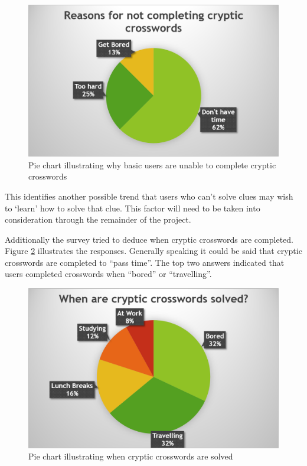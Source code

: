 \begin{figure}[H]
  \centering
  \includegraphics[scale=0.9]{graphs/incomplete_2.png}
  \caption{Pie chart illustrating why basic users are unable to complete cryptic
          crosswords}
  \label{fig:incompleted}
\end{figure}

This identifies another possible trend that users who can't solve clues may 
wish to `learn' how to solve that clue. This factor will need to be taken into
consideration through the remainder of the project.

Additionally the survey tried to deduce when cryptic crosswords are completed. 
Figure \ref{fig:when_solved} illustrates the responses. Generally speaking it 
could be said that cryptic crosswords are completed to ``pass time''. The top 
two answers indicated that users completed crosswords when ``bored'' or 
``travelling''.

\begin{figure}[H]
  \centering
  \includegraphics[scale=0.9]{graphs/when_solved.png}
  \caption{Pie chart illustrating when cryptic crosswords are solved}
  \label{fig:when_solved}
\end{figure}

